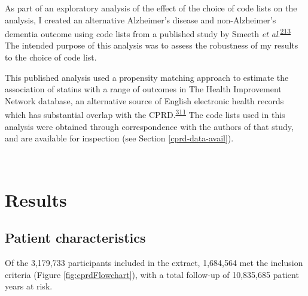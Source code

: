 \documentclass[a4paper, twoside]{templates/ociamthesis}
\begin{document}
As part of an exploratory analysis of the effect of the choice of code lists on the analysis, I created an alternative Alzheimer's disease and non-Alzheimer's dementia outcome using code lists from a published study by Smeeth \emph{et al}.\textsuperscript{\protect\hyperlink{ref-smeeth2009}{213}} The intended purpose of this analysis was to assess the robustness of my results to the choice of code list.

This published analysis used a propensity matching approach to estimate the association of statins with a range of outcomes in The Health Improvement Network database, an alternative source of English electronic health records which has substantial overlap with the CPRD.\textsuperscript{\protect\hyperlink{ref-carbonari2015}{311}} The code lists used in this analysis were obtained through correspondence with the authors of that study, and are available for inspection (see Section \ref{cprd-data-avail}).

~

\hypertarget{results}{%
\section{Results}\label{results}}

\hypertarget{patient-characteristics}{%
\subsection{Patient characteristics}\label{patient-characteristics}}

Of the 3,179,733 participants included in the extract, 1,684,564 met the inclusion criteria (Figure \ref{fig:cprdFlowchart}), with a total follow-up of 10,835,685 patient years at risk.

~
\end{document}
